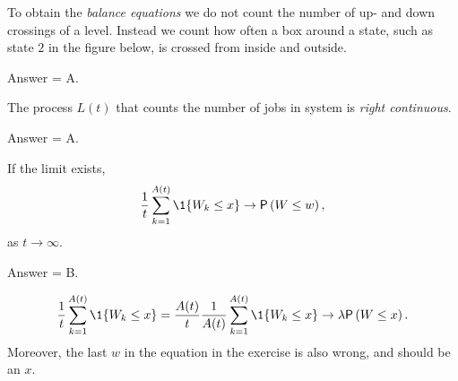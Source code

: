 \begin{exercise}[201802]
To obtain the \emph{ balance equations} we do not count the number of up- and down crossings of a level. Instead we count how often a box around a state, such as state $2$ in the figure below, is crossed from inside and outside. 

\begin{center}
 \end{center}
\begin{solution}
Answer = A.
\end{solution}
\end{exercise}

\begin{exercise}[201802]
The process $L(t)$ that counts the number of jobs in system is \emph{right continuous}.
\begin{solution}
Answer = A.
\end{solution}
\end{exercise}


\begin{exercise}[201803]
If the limit exists, 
\begin{equation*}
 \frac{1}{t} \sum_{k=1}^{A(t)} \1{W_k \leq x} \to \P{W\leq w},
\end{equation*}
as $t\to \infty$. 
\begin{solution}
Answer = B.

\begin{equation*}
 \frac{1}{t} \sum_{k=1}^{A(t)} \1{W_k \leq x} = 
 \frac{A(t)}{t} \frac 1{A(t)}\sum_{k=1}^{A(t)} \1{W_k \leq x} \to \lambda \P{W\leq x}.
\end{equation*}
Moreover, the last $w$ in the equation in the exercise is also wrong, and should be an $x$.
\end{solution}
\end{exercise}

